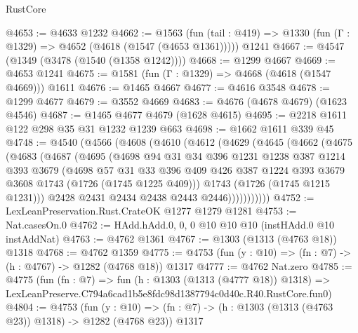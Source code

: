 \begin{lexlean}{RustCore}
\begin{coremodule}
@4653 := @4633 @1232
@4662 := @1563
    (fun (tail : @419) => @1330 (fun (Γ : @1329) => @4652 (@4618 (@1547 (@4653 @1361)))))
    @1241
@4667 := @4547 (@1349 (@3478 (@1540 (@1358 @1242))))
@4668 := @1299 @4667
@4669 := @4653 @1241
@4675 := @1581 (fun (Γ : @1329) => @4668 (@4618 (@1547 @4669))) @1611
@4676 := @1465 @4667
@4677 := @4616 @3548
@4678 := @1299 @4677
@4679 := @3552 @4669
@4683 := @4676 (@4678 @4679) (@1623 @4546)
@4687 := @1465 @4677 @4679 (@1628 @4615)
@4695 := @2218 @1611 @122 @298 @35 @31 @1232 @1239 @663
@4698 := @1662 @1611 @339 @45
@4748 := @4540
    (@4566
      (@4608
        (@4610
          (@4612
            (@4629
              (@4645
                (@4662
                  (@4675
                    (@4683
                      (@4687
                        (@4695
                          (@4698
                            @94
                            @31
                            @34
                            @396
                            @1231
                            @1238
                            @387
                            @1214
                            @393
                            @3679
                            (@4698
                              @57
                              @31
                              @33
                              @396
                              @409
                              @426
                              @387
                              @1224
                              @393
                              @3679
                              @3608
                              @1743
                              (@1726 (@1745 @1225 @409)))
                            @1743
                            (@1726 (@1745 @1215 @1231)))
                          @2428
                          @2431
                          @2434
                          @2438
                          @2443
                          @2446)))))))))))
@4752 := LexLeanPreservation.Rust.CrateOK @1277 @1279 @1281
@4753 := Nat.casesOn.{0}
@4762 := HAdd.hAdd.{0, 0, 0} @10 @10 @10 (instHAdd.{0} @10 instAddNat)
@4763 := @4762 @1361
@4767 := @1303 (@1313 (@4763 @18)) @1318
@4768 := @4762 @1359
@4775 := @4753 (fun (y : @10) => (fn : @7) -> (h : @4767) -> @1282 (@4768 @18)) @1317
@4777 := @4762 Nat.zero
@4785 := @4775
    (fun (fn : @7) =>
    fun (h : @1303 (@1313 (@4777 @18)) @1318) =>
    LexLeanPreserve.C794a6cad1b5e8fdc98d1387794c0d40c.R40.RustCore.fun0)
@4804 := @4753
    (fun (y : @10) => (fn : @7) -> (h : @1303 (@1313 (@4763 @23)) @1318) -> @1282 (@4768 @23))
    @1317

\end{coremodule}
\end{lexlean}
